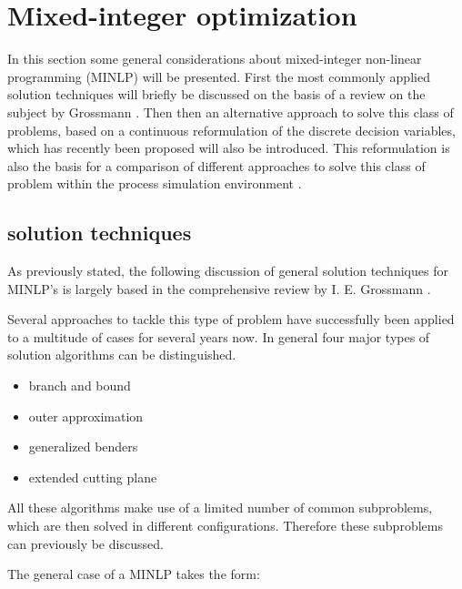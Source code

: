 \chapter{Mixed-integer optimization}
\label{chp:MINLP}
In this section some general considerations about mixed-integer non-linear programming (MINLP) will be presented. 
First the most commonly applied solution techniques will briefly be discussed on the basis of a review on the 
subject by Grossmann \cite{Grossmann.2002}. Then then an alternative approach to solve this class of problems,  
based on a continuous reformulation of the discrete decision variables, which has recently been proposed
\cite{Kraemer.2010,Stein.2004} will also be introduced. This reformulation is also the basis for a comparison of different 
approaches to solve this class of problem within the process simulation environment \gproms.  

    \section{solution techniques}

    As previously stated, the following discussion of general solution techniques for MINLP's is largely based 
    in the comprehensive review by I. E. Grossmann \cite{Grossmann.2002}. 
    
    Several approaches to tackle this type of problem have successfully been applied to a multitude of cases for 
    several years now. In general four major types of solution algorithms can be distinguished.  
    \begin{itemize}
        \item branch and bound
        \item outer approximation
        \item generalized benders
        \item extended cutting plane
    \end{itemize}
    All these algorithms make use of a limited number of common subproblems, which are then solved 
    in different configurations. Therefore these subproblems can previously be discussed.  

    The general case of a MINLP takes the form:
    
